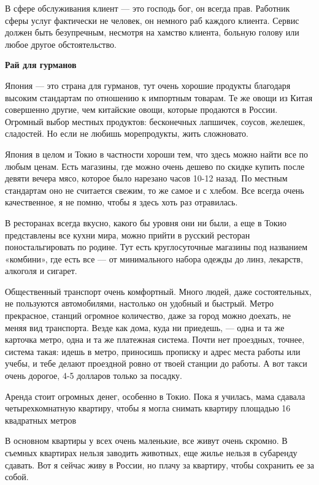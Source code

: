В сфере обслуживания клиент — это господь бог, он всегда прав. Работник сферы услуг фактически не человек, он немного раб каждого клиента. Сервис должен быть безупречным, несмотря на хамство клиента, больную голову или любое другое обстоятельство.

\textbf{Рай для гурманов}

Япония — это страна для гурманов, тут очень хорошие продукты благодаря высоким стандартам по отношению к импортным товарам. Те же овощи из Китая совершенно другие, чем китайские овощи, которые продаются в России. Огромный выбор местных продуктов: бесконечных лапшичек, соусов, желешек, сладостей. Но если не любишь морепродукты, жить сложновато.

Япония в целом и Токио в частности хороши тем, что здесь можно найти все по любым ценам. Есть магазины, где можно очень дешево по скидке купить после девяти вечера мясо, которое было нарезано часов 10-12 назад. По местным стандартам оно не считается свежим, то же самое и с хлебом. Все всегда очень качественное, я не помню, чтобы я здесь хоть раз отравилась.

В ресторанах всегда вкусно, какого бы уровня они ни были, а еще в Токио представлены все кухни мира, можно прийти в русский ресторан поностальгировать по родине. Тут есть круглосуточные магазины под названием «комбини», где есть все — от минимального набора одежды до линз, лекарств, алкоголя и сигарет.

Общественный транспорт очень комфортный. Много людей, даже состоятельных, не пользуются автомобилями, настолько он удобный и быстрый. Метро прекрасное, станций огромное количество, даже за город можно доехать, не меняя вид транспорта. Везде как дома, куда ни приедешь, — одна и та же карточка метро, одна и та же платежная система. Почти нет проездных, точнее, система такая: идешь в метро, приносишь прописку и адрес места работы или учебы, и тебе делают проездной ровно от твоей станции до работы. А вот такси очень дорогое, 4-5 долларов только за посадку.

\begin{fancyquotes}
    Аренда стоит огромных денег, особенно в Токио. Пока я училась, мама сдавала четырехкомнатную квартиру, чтобы я могла снимать квартиру площадью 16 квадратных метров
\end{fancyquotes}

В основном квартиры у всех очень маленькие, все живут очень скромно. В съемных квартирах нельзя заводить животных, еще жилье нельзя в субаренду сдавать. Вот я сейчас живу в России, но плачу за квартиру, чтобы сохранить ее за собой.

